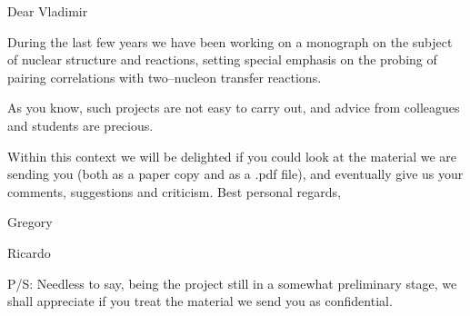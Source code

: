 \documentclass[a4paper,12pt]{book}
\begin{document}
%
Dear Vladimir


During the last few years we have been working on a monograph on the subject of nuclear structure and reactions, setting special emphasis on the probing of pairing correlations with two--nucleon transfer reactions.

As you know, such projects are not easy to carry out, and advice from colleagues and students are precious.

Within this context we will be delighted if you could look at the material we are sending you (both as a paper copy and as a .pdf file), and eventually give us your comments, suggestions and criticism.
Best personal regards,
\begin{flushleft}
Gregory
	\end{flushleft}
	\vspace{-1.37cm}
\begin{flushright}
 Ricardo
	\end{flushright}
	P/S: Needless to say, being the project still in a somewhat preliminary stage, we shall appreciate if you treat the material we send you as confidential.
\end{document}
